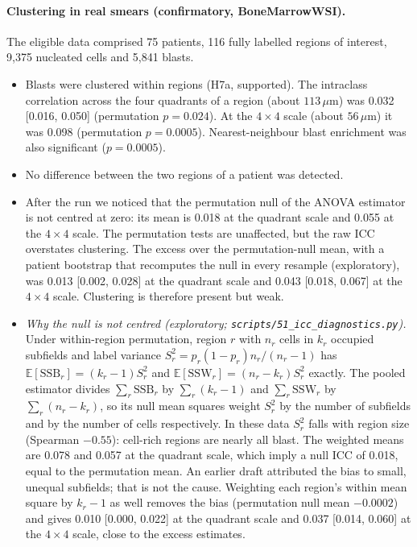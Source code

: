 \documentclass[11pt]{article}
\theoremstyle{remark}
\theoremstyle{definition}
\newcommand{\E}{\mathbb{E}}
\begin{document}
\paragraph{Clustering in real smears (confirmatory, BoneMarrowWSI).} The eligible data comprised 75 patients, 116 fully labelled regions of interest, 9,375 nucleated cells and 5,841 blasts.
\begin{itemize}
\item Blasts were clustered within regions (H7a, supported). The intraclass correlation across the four quadrants of a region (about $113\,\mu$m) was 0.032 [0.016, 0.050] (permutation $p=0.024$). At the $4\times4$ scale (about $56\,\mu$m) it was 0.098 (permutation $p=0.0005$). Nearest-neighbour blast enrichment was also significant ($p=0.0005$).
\item No difference between the two regions of a patient was detected.
\item After the run we noticed that the permutation null of the ANOVA estimator is not centred at zero: its mean is 0.018 at the quadrant scale and 0.055 at the $4\times4$ scale. The permutation tests are unaffected, but the raw ICC overstates clustering. The excess over the permutation-null mean, with a patient bootstrap that recomputes the null in every resample (exploratory), was 0.013 [0.002, 0.028] at the quadrant scale and 0.043 [0.018, 0.067] at the $4\times4$ scale. Clustering is therefore present but weak.
\item \emph{Why the null is not centred (exploratory; \texttt{scripts/51\_icc\_diagnostics.py}).} Under within-region permutation, region $r$ with $n_r$ cells in $k_r$ occupied subfields and label variance $S^2_r=p_r(1-p_r)n_r/(n_r-1)$ has $\E[\mathrm{SSB}_r]=(k_r-1)S^2_r$ and $\E[\mathrm{SSW}_r]=(n_r-k_r)S^2_r$ exactly. The pooled estimator divides $\sum_r\mathrm{SSB}_r$ by $\sum_r(k_r-1)$ and $\sum_r\mathrm{SSW}_r$ by $\sum_r(n_r-k_r)$, so its null mean squares weight $S^2_r$ by the number of subfields and by the number of cells respectively. In these data $S^2_r$ falls with region size (Spearman $-0.55$): cell-rich regions are nearly all blast. The weighted means are 0.078 and 0.057 at the quadrant scale, which imply a null ICC of 0.018, equal to the permutation mean. An earlier draft attributed the bias to small, unequal subfields; that is not the cause. Weighting each region's within mean square by $k_r-1$ as well removes the bias (permutation null mean $-0.0002$) and gives 0.010 [0.000, 0.022] at the quadrant scale and 0.037 [0.014, 0.060] at the $4\times4$ scale, close to the excess estimates.

\end{itemize}
\end{document}
